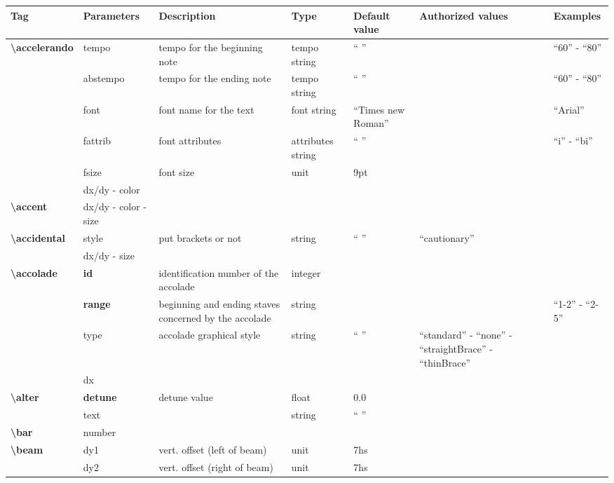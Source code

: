 \documentclass[a4paper, landscape, 10pt]{article}
\begin{document}
\begin{tabularx}{\linewidth}{p{3cm}p{3cm}p{6cm}p{2.5cm}p{2.5cm}p{3.5cm}p{3.5cm}}
    \hline
    \textbf{Tag}&\textbf{Parameters}&\textbf{Description}&\textbf{Type}&\textbf{Default value}&\textbf{Authorized values}&\textbf{Examples}\\
    \hline
    \textbf{\textbackslash{}accelerando}&tempo&tempo for the beginning note&tempo string&`` ''&&``60'' - ``80''\\
    &abstempo&tempo for the ending note&tempo string&`` ''&&``60'' - ``80''\\
    &font&font name for the text&font string&``Times new Roman''&&``Arial''\\
    &fattrib&font attributes&attributes string&`` ''&&``i'' - ``bi''\\
    &fsize&font size&unit&9pt&&\\
    &dx/dy - color&&&&&\\
    \hline
    \textbf{\textbackslash{}accent}&dx/dy - color - size&&&&&\\
    \hline
    \textbf{\textbackslash{}accidental}&style&put brackets or not&string&`` ''&``cautionary''&\\
    &dx/dy - size&&&&&\\
    \hline
    \textbf{\textbackslash{}accolade}&\textbf{id}&identification number of the accolade&integer&&&\\
    &\textbf{range}&beginning and ending staves concerned by the accolade&string&&&``1-2'' - ``2-5''\\
    &type&accolade graphical style&string&`` ''&``standard'' - ``none'' - ``straightBrace'' - ``thinBrace''&\\
    &dx&&&&&\\
    \hline
    \textbf{\textbackslash{}alter}&\textbf{detune}&detune value&float&0.0&&\\
    &text&&string&`` ''&&\\ %
    \hline
    \textbf{\textbackslash{}bar}&number&&&&&\\ %
    \hline
    \textbf{\textbackslash{}beam}&dy1&vert. offset (left of beam)&unit&7hs&&\\
    &dy2&vert. offset (right of beam)&unit&7hs&&\\

\end{tabularx}
\end{document}

